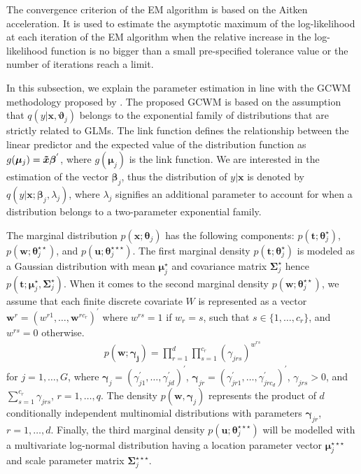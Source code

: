 \documentclass[11pt,letterpaper]{article}
\numberwithin{equation}{section}
\numberwithin{equation}{section}
\numberwithin{equation}{section}
\begin{document}
The convergence criterion of the EM algorithm is based on the Aitken acceleration. It is used to estimate the asymptotic maximum of the log-likelihood at each iteration of the EM algorithm when the relative increase in the log-likelihood function is no bigger than a small pre-specified tolerance value or the number of iterations reach a limit. %

In this subsection, we explain the parameter estimation in line with the GCWM methodology proposed by \cite{Ingrassia+Punzo+Vittadini+Minotti:2015}. The proposed GCWM  is based on the assumption that $q(y|\bm{x},\bm{\vartheta}_j)$ belongs to the exponential family of distributions that are strictly related to GLMs. The link function defines the relationship between the linear predictor and the expected value of the distribution function as $g(\bm{\mu}_j)= \bm{\tilde{x}} \bm{\beta}^{'}$, where $g(\bm{\mu}_j)$ is the link function. We are interested in the estimation of the vector $\bm {\beta}_j$, thus the distribution of $y|\bm{x}$ is denoted by $q(y|\bm{x}; \bm{\beta}_j, \lambda_j)$, where $\lambda_j$ signifies an additional parameter to account for when a distribution belongs to a two-parameter exponential family.

The marginal distribution $p(\bm{x}; \bm \theta_j)$ has the following components: $p(\bm{t}; \bm \theta_j^{\star})$, $p(\bm{w}; \bm \theta_j^{\star\star})$, and $p(\bm{u};\bm \theta_{j}^{\star\star\star})$. The first marginal density $p(\bm{t}; \bm \theta_j^{\star})$ is modeled as a  Gaussian distribution with mean $\bm {\mu}_j^{\star}$ and covariance matrix $\bm{\Sigma}_j^{\star}$ hence $p(\bm t; \bm {\mu}_j^{\star}, \bm{\Sigma}_j^{\star})$. When it comes to the second marginal density $p(\bm{w};\bm{\theta}_{j}^{\star\star})$, we assume that each finite discrete covariate $W$ is represented as a vector $\bm{w}^r=(w^{r1},\ldots,\bm{w}^{rc_r})^{'}$ where $w^{rs}=1$ if $w_r = s$, such that $s\in\{1, \ldots, c_r\}$, %
and $w^{rs}=0$ otherwise.
\begin{align}
p(\bm {w}; \bm {\gamma_j})=\prod_{r=1}^{d}\prod_{s=1}^{c_r}(\gamma_{jrs} )^{w^{rs}}
\label{eq31}
\end{align}
for $j=1, \ldots, G$, where $\bm {\gamma}_j=(\gamma_{j1}^{'}, \ldots, \gamma_{jd}^{'})^{'}$, $\bm \gamma_{jr}=(\gamma_{jr1}^{'}, \ldots, \gamma_{jrc_d}^{'})^{'}$, $\gamma_{jrs} > 0$, and  $\sum_{s=1}^{c_r}\gamma_{jrs}$, $r=1,\ldots,q$. The density $p(\bm {w}, \bm{\gamma}_j)$ represents the product of $d$ conditionally independent multinomial distributions with parameters $\bm{\gamma}_{jr}$, $r=1,\ldots, d$. Finally, the third marginal density $p(\bm{u};\bm{\theta}_{j}^{\star\star\star})$ will be modelled with a multivariate log-normal distribution having a location parameter vector $ \bm{\mu}_j^{\star\star\star}$ and scale parameter matrix $\bm{\Sigma}_j^{\star\star\star} $.
\end{document}
